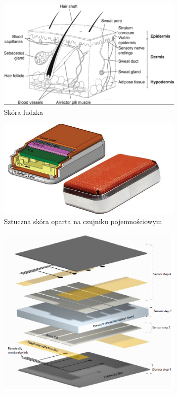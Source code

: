 \begin{figure}[!h]
  \begin{subfigure}[t]{0.33\linewidth}
    \centering
    \includegraphics[width=0.95\linewidth]{img/przekroj_skory.png} 
    \caption{Skóra ludzka \cite{b_book_skin_photo}} 
  \end{subfigure}%
  \begin{subfigure}[t]{0.33\linewidth}
    \centering
    \includegraphics[width=0.95\linewidth]{img/przekroj_duck.png}
    \caption{Sztuczna skóra oparta na czujniku pojemnościowym \cite{b_konf_kaczka_przekroj}} 
  \end{subfigure}
  \begin{subfigure}[t]{0.33\linewidth}
    \centering
    \includegraphics[width=0.95\linewidth]{img/przekroj_gietka.png}

\end{subfigure}
\end{figure}
